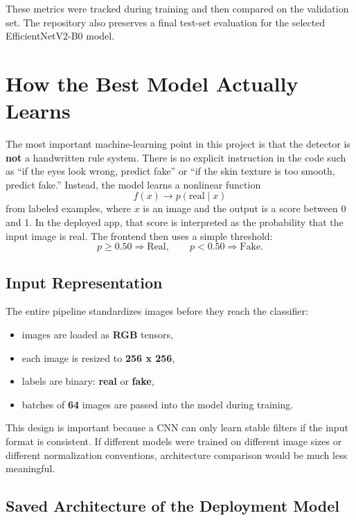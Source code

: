 \documentclass[11pt]{article}
\begin{document}
These metrics were tracked during training and then compared on the validation set. The repository also preserves a final test-set evaluation for the selected EfficientNetV2-B0 model.

\section{How the Best Model Actually Learns}

The most important machine-learning point in this project is that the detector is \textbf{not} a handwritten rule system. There is no explicit instruction in the code such as ``if the eyes look wrong, predict fake'' or ``if the skin texture is too smooth, predict fake.'' Instead, the model learns a nonlinear function
\[
f(x) \rightarrow p(\text{real}\mid x)
\]
from labeled examples, where \(x\) is an image and the output is a score between 0 and 1. In the deployed app, that score is interpreted as the probability that the input image is real. The frontend then uses a simple threshold:
\[
p \ge 0.50 \Rightarrow \text{Real}, \qquad p < 0.50 \Rightarrow \text{Fake}.
\]

\subsection{Input Representation}

The entire pipeline standardizes images before they reach the classifier:
\begin{itemize}[leftmargin=1.5em]
    \item images are loaded as \textbf{RGB} tensors,
    \item each image is resized to \textbf{256 x 256},
    \item labels are binary: \textbf{real} or \textbf{fake},
    \item batches of \textbf{64} images are passed into the model during training.
\end{itemize}

This design is important because a CNN can only learn stable filters if the input format is consistent. If different models were trained on different image sizes or different normalization conventions, architecture comparison would be much less meaningful.

\subsection{Saved Architecture of the Deployment Model}
\end{document}
